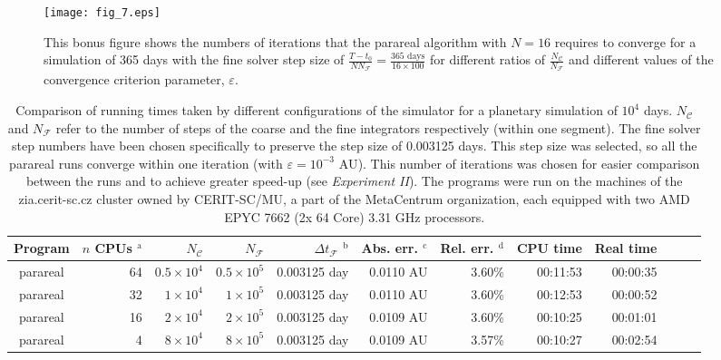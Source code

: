 \documentclass[conference]{IEEEtran}
\begin{document}
\begin{figure}[htbp]
\centerline{\texttt{[image: fig\_7.eps]}}
\caption{This bonus figure shows the numbers of iterations that the parareal algorithm with $N = 16$ requires to converge for a simulation of 365 days with the fine solver step size of $\frac{T-t_0}{NN_\mathcal{F}} = \frac{365\text{ days}}{16\times100}$ for different ratios of $\frac{N_\mathcal{C}}{N_\mathcal{F}}$ and different values of the convergence criterion parameter, $\varepsilon$.}
\label{arraytest}
\end{figure}

\begin{table*}[htbp]
\caption{Comparison of running times taken by different configurations of the simulator for a planetary simulation of $10^4$ days.
$N_\mathcal{C}$ and $N_\mathcal{F}$ refer to the number of steps of the coarse and the fine integrators respectively (within one segment). The fine solver step numbers have been chosen specifically to preserve the step size of 0.003125 days. This step size was selected, so all the parareal runs converge within one iteration (with $\varepsilon = 10^{-3}\text{ AU}$). This number of iterations was chosen for easier comparison between the runs and to achieve greater speed-up (see \textit{Experiment II}).
The programs were run on the machines of the zia.cerit-sc.cz cluster owned by CERIT-SC/MU, a part of the MetaCentrum organization, each equipped with two AMD EPYC 7662 (2x 64 Core) 3.31 GHz processors.}
\begin{center}
\begin{tabular}{crrrrrrrrrcc}
\toprule
Program & $n$ CPUs $^{\mathrm{a}}$ & $N_\mathcal{C}$ & $N_\mathcal{F}$ & $\Delta t_\mathcal{F}$ $^{\mathrm{b}}$ & Abs. err. $^{\mathrm{c}}$ & Rel. err. $^{\mathrm{d}}$ & CPU time & Real time \\
\midrule
parareal & 64 & $0.5\times10^4$ &  $0.5\times10^5$ & 0.003125 day & 0.0110 AU & 3.60\% & 00:11:53 & 00:00:35 \\
parareal & 32 & $1\times10^4$ &  $1\times10^5$ & 0.003125 day & 0.0110 AU & 3.60\% & 00:12:53 & 00:00:52 \\
parareal & 16 & $2\times10^4$ &  $2\times10^5$ & 0.003125 day & 0.0109 AU & 3.60\% & 00:10:25 & 00:01:01 \\
parareal & 4 & $8\times10^4$ &  $8\times10^5$ & 0.003125 day & 0.0109 AU & 3.57\% & 00:10:27 & 00:02:54 \\

\end{tabular}
\end{center}
\end{table*}
\end{document}
